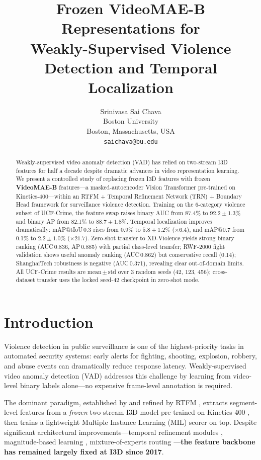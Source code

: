 \documentclass[11pt]{article}
\title{Frozen VideoMAE-B Representations for\\
       Weakly-Supervised Violence Detection and Temporal Localization}
\author{
  Srinivasa Sai Chava \\
  Boston University \\
  Boston, Massachusetts, USA \\
  \texttt{saichava@bu.edu}
}
\begin{document}
\maketitle

\begin{abstract}
Weakly-supervised video anomaly detection (VAD) has relied on
two-stream I3D features for half a decade despite dramatic advances
in video representation learning.
We present a controlled study of replacing frozen I3D features with
frozen \textbf{VideoMAE-B} features—a masked-autoencoder Vision Transformer
pre-trained on Kinetics-400—within an RTFM + Temporal Refinement Network
(TRN) + Boundary Head framework for surveillance violence detection.
Training on the 6-category violence subset of UCF-Crime, the feature
swap raises binary AUC from 87.4\% to $92.2 \pm 1.3$\% and binary AP
from 82.1\% to $88.7 \pm 1.8$\%.
Temporal localization improves dramatically: mAP@tIoU\,0.3 rises from
0.9\% to $5.8 \pm 1.2$\% (${\times}6.4$), and mAP@0.7 from 0.1\% to
$2.2 \pm 1.0$\% (${\times}21.7$).
Zero-shot transfer to XD-Violence yields strong binary ranking
(AUC\,0.836, AP\,0.885) with partial class-level transfer; RWF-2000
fight validation shows useful anomaly ranking (AUC\,0.862) but
conservative recall (0.14); ShanghaiTech robustness is negative
(AUC\,0.371), revealing clear out-of-domain limits.
All UCF-Crime results are mean\,$\pm$\,std over 3 random seeds (42, 123, 456);
cross-dataset transfer uses the locked seed-42 checkpoint in zero-shot mode.
\end{abstract}


\section{Introduction}

Violence detection in public surveillance is one of the highest-priority
tasks in automated security systems: early alerts for fighting, shooting,
explosion, robbery, and abuse events can dramatically reduce response
latency.
Weakly-supervised video anomaly detection (VAD) addresses this challenge
by learning from video-level binary labels alone—no expensive frame-level
annotation is required.

The dominant paradigm, established by \citet{sultani2018real}
and refined by RTFM \citep{tian2021weakly}, extracts segment-level features
from a \emph{frozen} two-stream I3D model pre-trained on
Kinetics-400 \citep{carreira2017quo}, then trains a lightweight Multiple
Instance Learning (MIL) scorer on top.
Despite significant architectural improvements—temporal refinement
modules \citep{wu2023surveillance}, magnitude-based
learning \citep{tian2021weakly}, mixture-of-experts
routing \citep{wang2025gsmoe}—\textbf{the feature backbone has remained
largely fixed at I3D since 2017}.
\end{document}

